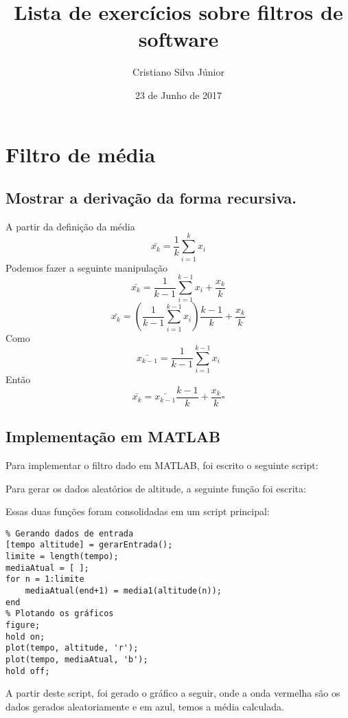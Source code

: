 \documentclass[12pt, a4paper, twoside]{article}
\begin{document}
\title{Lista de exercícios sobre filtros de software}
\author{Cristiano Silva Júnior}
\date{23 de Junho de 2017}
\maketitle

\section{Filtro de média}

\subsection{Mostrar a derivação da forma recursiva.}

A partir da definição da média
$$\bar{x_k}=\frac{1}{k}\sum^{k}_{i=1}{x_i}$$
Podemos fazer a seguinte manipulação
$$\bar{x_k}=\frac{1}{k-1}\sum^{k-1}_{i=1}{x_i}+\frac{x_k}{k}$$
$$\bar{x_k}=(\frac{1}{k-1}\sum^{k-1}_{i=1}{x_i})\frac{k-1}{k}+\frac{x_k}{k}$$
Como
$$\bar{x_{k-1}}=\frac{1}{k-1}\sum^{k-1}_{i=1}{x_i}$$
Então
$$\bar{x_k}=\bar{x_{k-1}}\frac{k-1}{k}+\frac{x_k}{k}\square$$

\subsection{Implementação em MATLAB}

Para implementar o filtro dado em MATLAB, foi escrito o seguinte script:



Para gerar os dados aleatórios de altitude, a seguinte função foi escrita:



Essas duas funções foram consolidadas em um script principal:

\begin{lstlisting}
% Gerando dados de entrada
[tempo altitude] = gerarEntrada();
limite = length(tempo);
mediaAtual = [ ];
for n = 1:limite
    mediaAtual(end+1) = media1(altitude(n));
end
% Plotando os gráficos
figure;
hold on;
plot(tempo, altitude, 'r');
plot(tempo, mediaAtual, 'b');
hold off;
\end{lstlisting}

A partir deste script, foi gerado o gráfico a seguir, onde a onda vermelha são os dados gerados aleatoriamente e em azul, temos a  média calculada.
\end{document}
